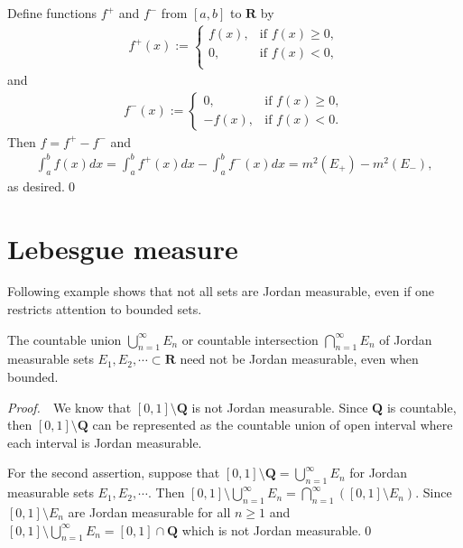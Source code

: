 \documentclass{book}
\theoremstyle{defstyle}
\theoremstyle{thmstyle}
\newcommand{\pff}{\noindent\emph{Proof.}~~}
\begin{document}
Define functions $f^+$ and $f^-$ from $[a, b]$ to $\mathbf{R}$ by
    \begin{align*}
        f^+(x) := \left\{\begin{array}{ll}
            f(x),   &\text{if } f(x) \geq 0,\\
            0,      &\text{if } f(x) < 0,\\
        \end{array}\right.
    \end{align*}
and
    \begin{align*}
        f^-(x) := \left\{\begin{array}{ll}
            0,      &\text{if } f(x) \geq 0,\\
            -f(x),  &\text{if } f(x) < 0.
        \end{array}\right.
    \end{align*}
Then $f = f^+ - f^-$ and
    \begin{align*}
        \int_{a}^{b}f(x)dx
        = \int_{a}^{b}f^+(x)dx - \int_{a}^{b}f^-(x)dx
        = m^2(E_+) - m^2(E_-),
    \end{align*}
as desired.\qed




\section{Lebesgue measure}

Following example shows that not all sets are Jordan measurable, even if one restricts attention to bounded sets.

\begin{example}
    The countable union $\bigcup_{n = 1}^{\infty} E_n$ or countable intersection $\bigcap_{n = 1}^{\infty} E_n$ of Jordan measurable sets $E_1, E_2, \cdots \subset \mathbf{R}$ need not be Jordan measurable, even when bounded.
\end{example}

\pff We know that $[0, 1] \setminus \mathbf{Q}$ is not Jordan measurable. Since $\mathbf{Q}$ is countable, then $[0, 1] \setminus \mathbf{Q}$ can be represented as the countable union of open interval where each interval is Jordan measurable.

For the second assertion, suppose that $[0, 1] \setminus \mathbf{Q} = \bigcup_{n = 1}^{\infty}E_n$ for Jordan measurable sets $E_1, E_2, \cdots$. Then $[0, 1] \setminus \bigcup_{n = 1}^{\infty}E_n = \bigcap_{n = 1}^{\infty}([0, 1] \setminus E_n)$. Since $[0, 1] \setminus E_n$ are Jordan measurable for all $n \geq 1$ and $[0, 1] \setminus \bigcup_{n = 1}^{\infty}E_n = [0, 1] \cap \mathbf{Q}$ which is not Jordan measurable.\qed
\end{document}
